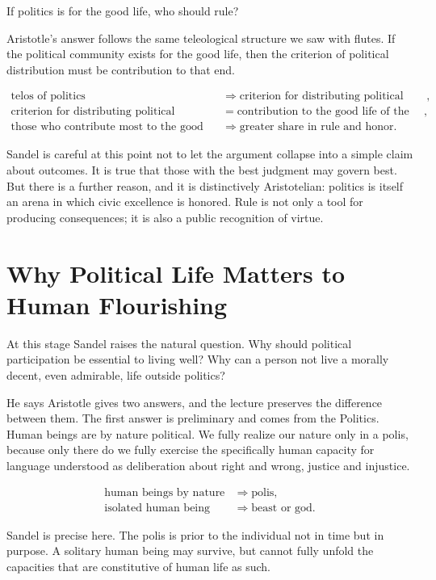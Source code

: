 If politics is for the good life, who should rule?

Aristotle's answer follows the same teleological structure we saw with flutes. If the political community exists for the good life, then the criterion of political distribution must be contribution to that end.

\begin{align}
\text{telos of politics}
&\Longrightarrow
\text{criterion for distributing political authority},\\
\text{criterion for distributing political authority}
&=
\text{contribution to the good life of the polis},\\
\text{those who contribute most to the good life of the polis}
&\Longrightarrow
\text{greater share in rule and honor}.
\end{align}

Sandel is careful at this point not to let the argument collapse into a simple claim about outcomes. It is true that those with the best judgment may govern best. But there is a further reason, and it is distinctively Aristotelian: politics is itself an arena in which civic excellence is honored. Rule is not only a tool for producing consequences; it is also a public recognition of virtue.

\section{Why Political Life Matters to Human Flourishing}

At this stage Sandel raises the natural question. Why should political participation be essential to living well? Why can a person not live a morally decent, even admirable, life outside politics?

He says Aristotle gives two answers, and the lecture preserves the difference between them. The first answer is preliminary and comes from the Politics. Human beings are by nature political. We fully realize our nature only in a polis, because only there do we fully exercise the specifically human capacity for language understood as deliberation about right and wrong, justice and injustice.

\begin{align}
\text{human beings by nature}
&\Longrightarrow
\text{polis},\\
\text{isolated human being}
&\Longrightarrow
\text{beast or god}.
\end{align}

Sandel is precise here. The polis is prior to the individual not in time but in purpose. A solitary human being may survive, but cannot fully unfold the capacities that are constitutive of human life as such.

